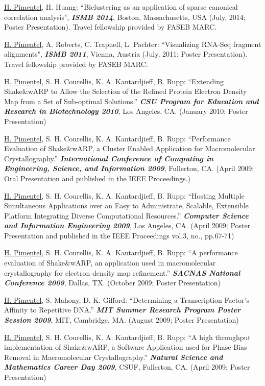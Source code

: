 \documentclass[overlapped]{res}
\begin{document}
\begin{resume}
\underline{H. Pimentel}, H. Huang: ``Biclustering as an application of sparse
canonical correlation analysis", {\bf \emph{ISMB 2014}}, Boston, Massachusetts,
USA (July, 2014; Poster Presentation). Travel fellowship provided by FASEB
MARC.

\underline{H. Pimentel}, A. Roberts, C. Trapnell, L. Pachter: ``Visualizing
RNA-Seq fragment alignments", {\bf \emph{ISMB 2011}}, Vienna, Austria (July,
2011; Poster Presentation). Travel fellowship provided by FASEB MARC.

\underline{H. Pimentel}, S. H. Courellis, K. A. Kantardjieff, B. Rupp:
``Extending Shake\&wARP to Allow the Selection of the Refined Protein Electron
Density Map from a Set of Sub-optimal Solutions.'' {\bf \emph{CSU Program for
    Education and Research in Biotechnology 2010}}, Los Angeles, CA. (January
2010; Poster Presentation)

\underline{H. Pimentel}, S. H. Courellis, K. A. Kantardjieff, B. Rupp:
``Performance Evaluation of Shake\&wARP, a Cluster Enabled Application for
Macromolecular Crystallography.'' {\bf \emph{International Conference of
    Computing in Engineering, Science, and Information
    2009}}, Fullerton, CA. (April 2009; Oral Presentation and published in the
         IEEE Proceedings.)

\underline{H. Pimentel}, S. H. Courellis, K. A. Kantardjieff, B. Rupp:
``Hosting Multiple Simultaneous Applications over an Easy to
Administrate, Scalable, Extensible Platform Integrating Diverse
Computational Resources.'' {\bf \emph{Computer Science and Information
    Engineering 2009}}, Los Angeles,
CA. (April 2009; Poster Presentation and published in the
IEEE Proceedings vol.3, no., pp.67-71)

\underline{H. Pimentel}, S. H. Courellis, K. A. Kantardjieff, B. Rupp: ``A
performance evaluation of Shake\&wARP, an application used in macromolecular
crystallography for electron density map refinement.''  {\bf \emph{SACNAS
    National Conference 2009}}, Dallas, TX. (October 2009; Poster Presentation)

\underline{H. Pimentel}, S. Mahony, D. K. Gifford: ``Determining a
Transcription Factor's Affinity to Repetitive DNA.'' {\bf \emph{MIT
    Summer Research Program Poster Session 2009}}, MIT, Cambridge,
MA. (August 2009; Poster Presentation)

\underline{H. Pimentel}, S. H. Courellis, K. A. Kantardjieff, B. Rupp: ``A high
throughput implementation of Shake\&wARP, a Software Application used for Phase
Bias Removal in Macromolecular Crystallography.'' {\bf \emph{Natural Science and
    Mathematics Career Day 2009}}, CSUF, Fullerton, CA. (April 2009; Poster
Presentation)


\end{resume}
\end{document}
